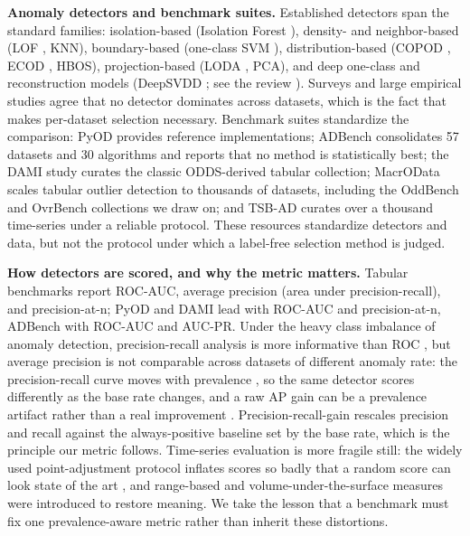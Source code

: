 \documentclass[3p,twocolumn]{elsarticle}
\begin{document}
\textbf{Anomaly detectors and benchmark suites.} Established detectors span the standard families: isolation-based (Isolation Forest \cite{ref8}), density- and neighbor-based (LOF \cite{ref9}, KNN), boundary-based (one-class SVM \cite{ref10}), distribution-based (COPOD \cite{ref11}, ECOD \cite{ref12}, HBOS), projection-based (LODA \cite{ref13}, PCA), and deep one-class and reconstruction models (DeepSVDD \cite{ref14}; see the review \cite{ref15}). Surveys \cite{ref15} and large empirical studies \cite{ref5, ref16} agree that no detector dominates across datasets, which is the fact that makes per-dataset selection necessary. Benchmark suites standardize the comparison: PyOD \cite{ref6} provides reference implementations; ADBench \cite{ref5} consolidates 57 datasets and 30 algorithms and reports that no method is statistically best; the DAMI study \cite{ref16} curates the classic ODDS-derived tabular collection; MacrOData \cite{ref20} scales tabular outlier detection to thousands of datasets, including the OddBench and OvrBench collections we draw on; and TSB-AD \cite{ref19} curates over a thousand time-series under a reliable protocol. These resources standardize detectors and data, but not the protocol under which a label-free selection method is judged.

\textbf{How detectors are scored, and why the metric matters.} Tabular benchmarks report ROC-AUC, average precision (area under precision-recall), and precision-at-n; PyOD and DAMI \cite{ref6, ref16} lead with ROC-AUC and precision-at-n, ADBench \cite{ref5} with ROC-AUC and AUC-PR. Under the heavy class imbalance of anomaly detection, precision-recall analysis is more informative than ROC \cite{ref26, ref27}, but average precision is not comparable across datasets of different anomaly rate: the precision-recall curve moves with prevalence \cite{ref27}, so the same detector scores differently as the base rate changes, and a raw AP gain can be a prevalence artifact rather than a real improvement \cite{ref29}. Precision-recall-gain \cite{ref28} rescales precision and recall against the always-positive baseline set by the base rate, which is the principle our metric follows. Time-series evaluation is more fragile still: the widely used point-adjustment protocol inflates scores so badly that a random score can look state of the art \cite{ref31}, and range-based and volume-under-the-surface measures \cite{ref32, ref33} were introduced to restore meaning. We take the lesson that a benchmark must fix one prevalence-aware metric rather than inherit these distortions.
\end{document}
